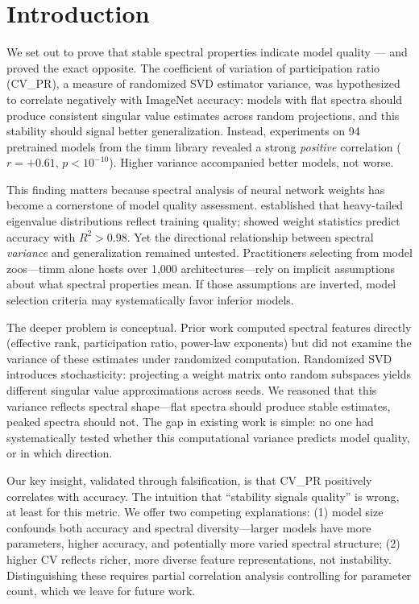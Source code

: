 \section{Introduction}
\label{sec:introduction}

We set out to prove that stable spectral properties indicate model quality --- and proved the exact opposite. The coefficient of variation of participation ratio (CV\_PR), a measure of randomized SVD estimator variance, was hypothesized to correlate negatively with ImageNet accuracy: models with flat spectra should produce consistent singular value estimates across random projections, and this stability should signal better generalization. Instead, experiments on 94 pretrained models from the timm library revealed a strong \emph{positive} correlation ($r = +0.61$, $p < 10^{-10}$). Higher variance accompanied better models, not worse.

This finding matters because spectral analysis of neural network weights has become a cornerstone of model quality assessment. \citet{martin2019traditional} established that heavy-tailed eigenvalue distributions reflect training quality; \citet{unterthiner2020predicting} showed weight statistics predict accuracy with $R^2 > 0.98$. Yet the directional relationship between spectral \emph{variance} and generalization remained untested. Practitioners selecting from model zoos---timm alone hosts over 1,000 architectures---rely on implicit assumptions about what spectral properties mean. If those assumptions are inverted, model selection criteria may systematically favor inferior models.

The deeper problem is conceptual. Prior work computed spectral features directly (effective rank, participation ratio, power-law exponents) but did not examine the variance of these estimates under randomized computation. Randomized SVD introduces stochasticity: projecting a weight matrix onto random subspaces yields different singular value approximations across seeds. We reasoned that this variance reflects spectral shape---flat spectra should produce stable estimates, peaked spectra should not. The gap in existing work is simple: no one had systematically tested whether this computational variance predicts model quality, or in which direction.

Our key insight, validated through falsification, is that CV\_PR positively correlates with accuracy. The intuition that ``stability signals quality'' is wrong, at least for this metric. We offer two competing explanations: (1) model size confounds both accuracy and spectral diversity---larger models have more parameters, higher accuracy, and potentially more varied spectral structure; (2) higher CV reflects richer, more diverse feature representations, not instability. Distinguishing these requires partial correlation analysis controlling for parameter count, which we leave for future work.

